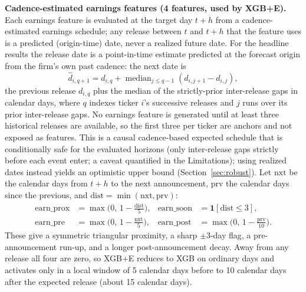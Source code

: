 \documentclass[runningheads,a4paper]{llncs}
\begin{document}
\textbf{Cadence-estimated earnings features (4 features, used by XGB+E).} Each earnings feature is evaluated
at the target day $t+h$ from a cadence-estimated earnings schedule; any release between $t$ and $t+h$ that
the feature uses is a predicted (origin-time) date, never a realized future date. For the headline results
the release date is a point-in-time estimate predicted at the forecast origin from the firm's own past
cadence: the next date is
\[ \hat d_{i,q+1} = d_{i,q} + \operatorname{median}_{j\le q-1}\left(d_{i,j+1}-d_{i,j}\right), \]
the previous release $d_{i,q}$ plus the median of the strictly-prior inter-release gaps in calendar days,
where $q$ indexes ticker $i$'s successive releases and $j$ runs over its prior inter-release gaps.
No earnings feature is generated until at least three historical releases are available, so the first three
per ticker are anchors and not exposed as features. This is a causal cadence-based expected schedule that is
conditionally safe for the evaluated horizons (only inter-release gaps strictly before each event enter; a
caveat quantified in the Limitations); using realized dates instead yields an optimistic upper bound
(Section~\ref{sec:robust}). Let $\mathrm{nxt}$ be the calendar days from $t+h$ to
the next announcement, $\mathrm{prv}$ the calendar days since the previous, and
$\mathrm{dist}=\min(\mathrm{nxt},\mathrm{prv})$:
\begin{align}
\mathrm{earn\_prox} &= \max\!\Big(0,\,1-\tfrac{\mathrm{dist}}{5}\Big), &
\mathrm{earn\_soon} &= \mathbf{1}[\mathrm{dist}\le 3],\\
\mathrm{earn\_pre} &= \max\!\Big(0,\,1-\tfrac{\mathrm{nxt}}{5}\Big), &
\mathrm{earn\_post} &= \max\!\Big(0,\,1-\tfrac{\mathrm{prv}}{10}\Big).
\end{align}
These give a symmetric triangular proximity, a sharp $\pm 3$-day flag, a pre-announcement run-up, and a
longer post-announcement decay. Away from any release all four are zero, so XGB+E reduces to XGB on ordinary
days and activates only in a local window of 5 calendar days before to 10 calendar days after the expected
release (about 15 calendar days).
\end{document}
